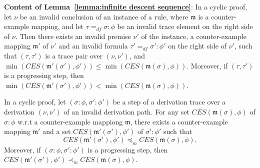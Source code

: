 \documentclass[manuscript,screen]{acmart}
\newcommand{\mfr}[1]{\mathfrak{#1}}
\newcommand{\dddef}[0]{=_{df}}
\newcommand{\mult}[0]{\preceq_m}
\newcommand{\pmult}[0]{\prec_m}
\newcommand{\lm}[0]{\mfr{m}}
\newcommand{\EX}[0]{\textit{CES}}
\begin{document}
\ifx
\textbf{Content of Lemma~\ref{lemma:infinite descent sequence}}:
In a cyclic proof, 
let $\nu$ be an invalid conclusion of an instance of a rule, where $\lm$ is a counter-example mapping, and let $\tau\dddef \sigma : \phi$ be an invalid trace element on the right side of $\nu$. 
    Then there exists an invalid premise $\nu'$ of the instance, a counter-example mapping $\lm'$ of $\nu'$ and an invalid formula $\tau'\dddef \sigma' : \phi'$ on the right side of $\nu'$, such that 
    $(\tau, \tau')$ is a trace pair over $(\nu, \nu')$, and
    $\min(\EX(\lm'(\sigma'), \phi')) \le \min(\EX(\lm(\sigma), \phi))$. 
    Moreover, if $(\tau, \tau')$ is a progressing step, then $\min(\EX(\lm'(\sigma'), \phi')) < \min(\EX(\lm(\sigma), \phi))$. 

    \ifx
    In a cyclic proof, 
    let $(\sigma:\phi, \sigma':\phi')$ be a step of a derivation trace over a derivation $(\nu, \nu')$ of an invalid derivation path.  
    For any set $\EX(\lm(\sigma), \phi)$ of $\sigma : \phi$ w.r.t a counter-example mappiong $\lm$, 
    there exists a counter-example mapping $\lm'$ and a set $\EX(\lm'(\sigma'), \phi')$ of $\sigma':\phi'$ such that 
    $$\EX(\lm'(\sigma'), \phi')\mult \EX(\lm(\sigma), \phi).$$ Moreover, if $(\sigma:\phi, \sigma':\phi')$ is a progressing step, then 
    $\EX(\lm'(\sigma'), \phi')\pmult \EX(\lm(\sigma), \phi)$. 
\fi
\fi
\end{document}
